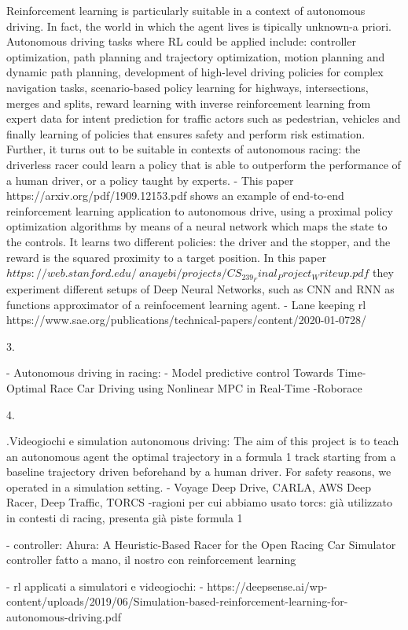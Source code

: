 Reinforcement learning is particularly suitable in a context of autonomous driving. In fact, the world in which the agent lives is tipically unknown-a priori.
Autonomous driving tasks where RL could be applied include: controller optimization, path planning and trajectory optimization, motion planning and dynamic path planning, development of high-level driving policies for complex navigation tasks, scenario-based policy learning for highways, intersections, merges and splits, reward learning with inverse reinforcement learning from expert data for intent prediction for traffic actors such as pedestrian, vehicles and finally learning of policies that ensures safety and perform risk estimation. Further, it turns out to be suitable in contexts of autonomous racing: the driverless racer could learn a policy that is able to outperform the performance of a human driver, or a policy taught by experts.
- This paper https://arxiv.org/pdf/1909.12153.pdf shows an example of end-to-end reinforcement learning application to autonomous drive, using a proximal policy optimization algorithms by means of a neural network which maps the state to the controls. It learns two different policies: the driver and the stopper, and the reward is the squared proximity to a target position.
In this paper $https://web.stanford.edu/~anayebi/projects/CS_239_Final_Project_Writeup.pdf$ they experiment different setups of Deep Neural Networks, such as CNN and RNN as functions approximator of a reinfocement learning agent.
- Lane keeping rl https://www.sae.org/publications/technical-papers/content/2020-01-0728/


3.

- Autonomous driving in racing:
- Model predictive control Towards Time-Optimal Race Car Driving using Nonlinear MPC in
Real-Time
-Roborace



4.

.Videogiochi e simulation autonomous driving:
The aim of this project is to teach an autonomous agent the optimal trajectory in a formula 1 track starting from a baseline trajectory driven beforehand by a human driver. For safety reasons, we operated in a simulation setting.
- Voyage Deep Drive, CARLA, AWS Deep Racer, Deep Traffic, TORCS
	-ragioni per cui abbiamo usato torcs: già utilizzato in contesti di racing, presenta già piste formula 1


- controller: Ahura: A Heuristic-Based Racer for the Open Racing Car Simulator
		controller fatto a mano, il nostro con reinforcement learning

	- rl applicati a simulatori e videogiochi:
		- https://deepsense.ai/wp-content/uploads/2019/06/Simulation-based-reinforcement-learning-for-autonomous-driving.pdf
	
	
	

	
	
	
	
